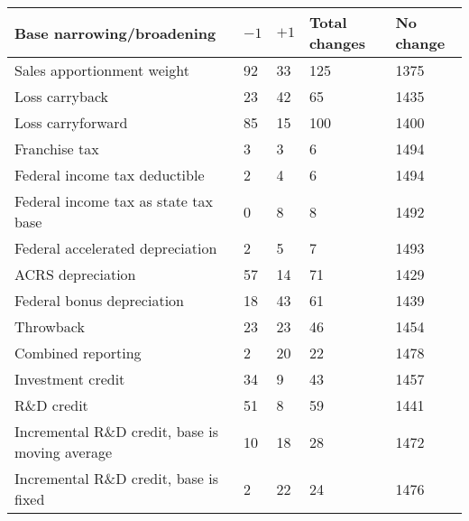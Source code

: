 \begin{tabular}{l*{4}{l}}
\hline
Base narrowing/broadening & $-1$ & $+1$ & Total changes & No change \\
\hline
Sales apportionment weight&92&33&125&1375\\
Loss carryback&23&42&65&1435\\
Loss carryforward&85&15&100&1400\\
Franchise tax&3&3&6&1494\\
Federal income tax deductible&2&4&6&1494\\
Federal income tax as state tax base&0&8&8&1492\\
Federal accelerated depreciation&2&5&7&1493\\
ACRS depreciation&57&14&71&1429\\
Federal bonus depreciation&18&43&61&1439\\
Throwback&23&23&46&1454\\
Combined reporting&2&20&22&1478\\
Investment credit&34&9&43&1457\\
R\&D credit&51&8&59&1441\\
Incremental R\&D credit, base is moving average&10&18&28&1472\\
Incremental R\&D credit, base is fixed&2&22&24&1476\\
\hline
\end{tabular}
